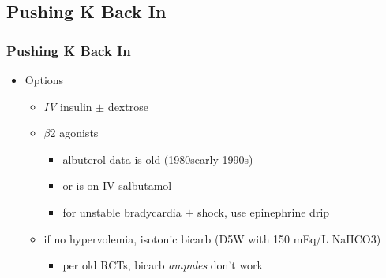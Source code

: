 \documentclass{beamer}
\begin{document}
\subsection{Pushing K Back In}
\begin{frame}
	\frametitle{Pushing K Back In}
	\begin{itemize}
		\item Options%
		\pause
			\begin{itemize}
				\item \emph{IV} insulin $\pm$ dextrose
				\item $\beta$2 agonists
					\begin{itemize}
						\item albuterol data is old (1980s\textendash early 1990s)
						\item or is on IV salbutamol
						\item for unstable bradycardia $\pm$ shock, use epinephrine drip
					\end{itemize}
				\item if no hypervolemia, isotonic bicarb (D5W with 150 mEq/L NaHCO3)
					\begin{itemize}
						\item per old RCTs, bicarb \emph{ampules} don't work
					\end{itemize}
			\end{itemize}
	\end{itemize}
\end{frame}
\end{document}
